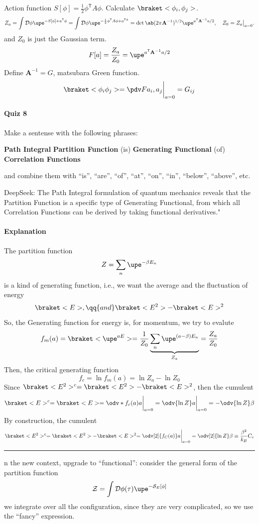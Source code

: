 \begin{example}
  Action function $S[\phi] = \frac12 \phi^{\mathsf T} A\phi$.
  Calculate $\braket<\phi_i, \phi_j>$.
  \[
    Z_a = \int \mathcal D\phi \upe^{-S[\phi]+a^{\mathsf T}\phi}
  = \int\mathcal D\phi \upe^{-\frac12\phi^{\mathsf T}A\phi + a^{\mathsf T\phi}}
  = \det\ab(2\pi\mathbf A^{-1})^{1/2} \upe^{a^{\mathsf T}\mathbf A^{-1}a/2},
    \quad
    Z_0 = Z_a\big|_{a=0}.
  \]
  and $Z_0$ is just the Gaussian term.
  \[  
  F[a] = \frac{Z_a}{Z_0} = \upe^{a^{\mathsf T}\mathbf A^{-1}a/2}
  \]
  Define $\mathbf A^{-1} = G$, matsubara Green function.
  \[
    \braket<\phi_i\phi_j> = \pdv F{a_i, a_j}\bigg|_{a=0}
  = G_{ij}
  \]
\end{example}

\paragraph{Quiz 8}

Make a sentense with the following phrases:

\textbf{Path Integral}
\textbf{Partition Function} (is)
\textbf{Generating Functional} (of)
\textbf{Correlation Functions}

and combine them with ``is'', ``are'', ``of'', ``at'', ``on'', ``in'', ``below'', ``above'', etc.

DeepSeek: The Path Integral formulation of quantum mechanics reveals that the Partition Function is a specific type of Generating Functional, from which all Correlation Functions can be derived by taking functional derivatives."

\paragraph{Explanation}

The partition function
\[
  Z = \sum_n \upe^{-\beta E_n}
\]
is a kind of generating function, i.e., we want the average and the fluctuation of energy
\[
  \braket<E>, \qq{and} \braket<E^2> - \braket<E>^2
\]
So, the Generating function for energy is, for momentum, we try to evalute
\[
  f_m(a) = \braket<\upe^{aE}> = \frac1{Z_0} \underbrace{\sum_n \upe^{(a-\beta) E_n}}_{Z_a} = \frac{Z_a}{Z_0}
\]
Then, the critical generating function
\[
  f_c = \ln f_m(a) = \ln Z_a - \ln Z_0
\]
Since $\braket<E^2>^c = \braket<E^2> - \braket<E>^2$, then the cumulent
\[
  \braket<E>^c = \braket<E> = \odv*{f_c(a)}a \bigg|_{a=0}
= \odv{\ln Z}a \bigg|_{a=0} = -\odv{\ln Z}\beta
\]
By construction, the cumulent
\[
  \braket<E^2>^c = \braket<E^2> - \braket<E>^2 = \odv[2]{f_C(a)}a\bigg|_{a=0}
= \odv[2]{\ln Z}\beta
\equiv \frac{\beta^2}{k_B}C_v
\]
\rule \linewidth {.5pt}
In the new context, upgrade to ``functional'': consider the general form of the
partition function
\[
  \mathcal Z = \int \mathcal D\phi(\tau) \upe^{-\mathcal S_E[\phi]}
\]
we integrate over all the configuration, since they are very complicated, so we
use the ``fancy'' expression.

